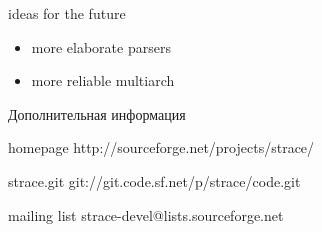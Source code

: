 \documentclass[unicode]{beamer}
\begin{document}
\begin{frame}{ideas for the future}
	\begin{itemize}
		\item more elaborate parsers
		\item more reliable multiarch
	\end{itemize}
\end{frame}

\begin{frame}{Дополнительная информация}
\begin{block}{homepage}
	http://sourceforge.net/projects/strace/
\end{block}
\begin{block}{strace.git}
	git://git.code.sf.net/p/strace/code.git
\end{block}
\begin{block}{mailing list}
	strace-devel@lists.sourceforge.net
\end{block}
\end{frame}
\end{document}
